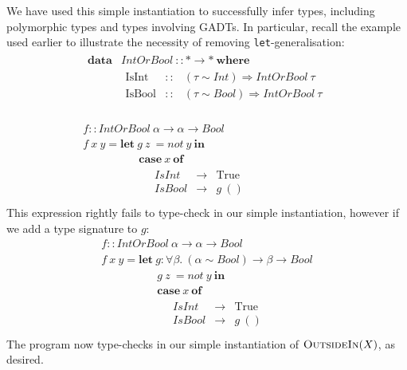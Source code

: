 \documentclass[a4paper]{jfp}
\newcommand{\outsidein}{\textsc{OutsideIn}(X)}
\begin{document}
We have used this simple instantiation to successfully infer types, including polymorphic types and types involving GADTs. In particular, recall the
example used earlier to illustrate the necessity of removing {\tt let}-generalisation: 
\begin{displaymath}
   \begin{array}{l}
	\begin{array}{ll}		
		\textbf{data} & \mathit{IntOrBool}\ :: \mathtt{*} \rightarrow \mathtt{*}\ \textbf{where} \\
		              & \begin{array}{lcl}
                         \text{IsInt} & :: & (\tau \sim \mathit{Int}) \Rightarrow \mathit{IntOrBool}\ \tau \\
                         \text{IsBool} & :: & (\tau \sim \mathit{Bool}) \Rightarrow \mathit{IntOrBool}\ \tau \\
					    \end{array} \\						
     \end{array} \\ \\
\mathit{f} :: \mathit{IntOrBool}\ \alpha \rightarrow \alpha \rightarrow \mathit{Bool} \\
\mathit{f}\ x\ y = \textbf{let}\ g\ z\ = \mathit{not}\ y\ \textbf{in}  \\
\quad\quad\quad\quad\quad\textbf{case}\ x\ \textbf{of} \\
\quad\quad\quad\quad\quad\quad\begin{array}{lll}
   \mathit{IsInt} & \rightarrow & \text{True} \\
   \mathit{IsBool} & \rightarrow & g\ ()\\
   \end{array}
   \end{array}
\end{displaymath}
This expression rightly fails to type-check in our simple instantiation, however if we add a type signature to $g$:
\begin{displaymath}
	\begin{array}{ll}		
\mathit{f} :: \mathit{IntOrBool}\ \alpha \rightarrow \alpha \rightarrow \mathit{Bool} \\
\mathit{f}\ x\ y = \textbf{let}\ g : \forall \beta.\  (\alpha \sim \mathit{Bool}) \rightarrow \beta \rightarrow \mathit{Bool} \\ 
\quad\quad\quad\quad\quad g\ z\ = \mathit{not}\ y\ \textbf{in}  \\
\quad\quad\quad\quad\quad\textbf{case}\ x\ \textbf{of} \\
\quad\quad\quad\quad\quad\quad\begin{array}{lll}
   \mathit{IsInt} & \rightarrow & \text{True} \\
   \mathit{IsBool} & \rightarrow & g\ ()\\
   \end{array}
\end{array}
\end{displaymath}
The program now type-checks in our simple instantiation of $\outsidein$, as desired.
\end{document}
